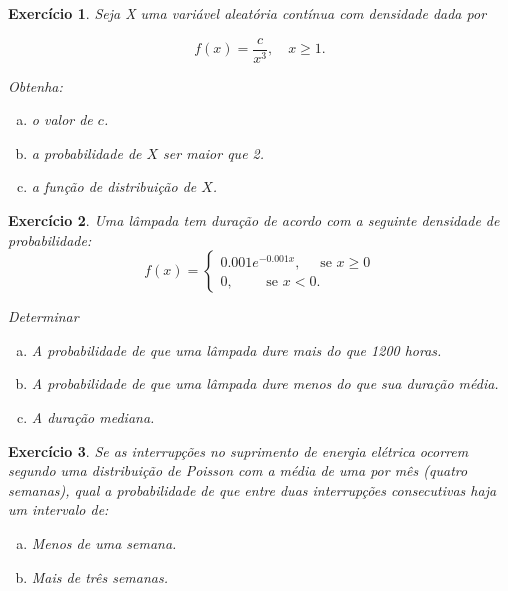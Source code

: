 \documentclass[letter,11pt]{article}
\newtheorem{exer}{Exercício}
\begin{document}
\medskip
\begin{exer} \rm 
Seja X uma variável aleatória contínua com densidade dada por

\[f(x) =\frac{c}{x^3},\quad x \geq 1.\]

Obtenha:
\begin{enumerate}[a)]
  \item o valor de $c$. 
  \item a probabilidade de $X$ ser maior que 2.
  \item a função de distribuição de $X$.
\end{enumerate}
\end{exer}%

\medskip
\begin{exer} \rm 
Uma lâmpada tem duração de acordo com a seguinte densidade de probabilidade:
\[f(x)=\begin{cases} 0.001e^{-0.001x},\quad \mbox{ se } x\geq 0\\
                       0, \quad \quad       \mbox{ se } x<0.
         \end{cases}\]

 Determinar
\begin{enumerate}[a)]
\item A probabilidade de que uma lâmpada dure mais do que 1200 horas. 


\item  A probabilidade de que uma lâmpada dure menos do que sua duração média.

\item  A duração mediana.

\end{enumerate}
\end{exer}%


\medskip
\begin{exer} \rm Se as interrupções no suprimento de energia elétrica ocorrem 
segundo uma distribuição de Poisson com a média de uma por mês (quatro semanas), 
qual a probabilidade de que entre duas interrupções consecutivas haja um 
intervalo de:
\begin{enumerate}[a)]
  \item Menos de uma semana.
  \item Mais de três semanas.
\end{enumerate}
\end{exer}%
\end{document}
